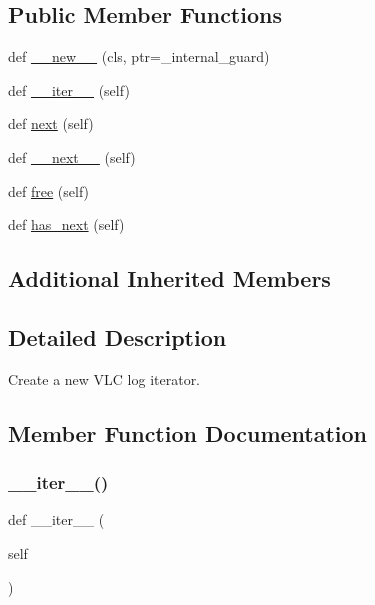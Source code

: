 \subsection*{Public Member Functions}
\begin{DoxyCompactItemize}
\item 
def \hyperlink{classvlc_1_1_log_iterator_a2ed91930af7622fec54ade5b2d4b2315}{\+\_\+\+\_\+new\+\_\+\+\_\+} (cls, ptr=\+\_\+internal\+\_\+guard)
\item 
def \hyperlink{classvlc_1_1_log_iterator_a45163c19b7c87f553c6f1d055d4668cb}{\+\_\+\+\_\+iter\+\_\+\+\_\+} (self)
\item 
def \hyperlink{classvlc_1_1_log_iterator_a9dbee9488c9365114fed347d1a8846f1}{next} (self)
\item 
def \hyperlink{classvlc_1_1_log_iterator_a71d9958aa7271de5bb07b861c559d970}{\+\_\+\+\_\+next\+\_\+\+\_\+} (self)
\item 
def \hyperlink{classvlc_1_1_log_iterator_abc0100ebe0f74d4c2e0da92529c2890b}{free} (self)
\item 
def \hyperlink{classvlc_1_1_log_iterator_aa8de9cca1082708d185d2850c9f2a29a}{has\+\_\+next} (self)
\end{DoxyCompactItemize}
\subsection*{Additional Inherited Members}


\subsection{Detailed Description}
\begin{DoxyVerb}Create a new VLC log iterator.\end{DoxyVerb}
 

\subsection{Member Function Documentation}
\mbox{\label{classvlc_1_1_log_iterator_a45163c19b7c87f553c6f1d055d4668cb}} 
\subsubsection{\texorpdfstring{\+\_\+\+\_\+iter\+\_\+\+\_\+()}{\_\_iter\_\_()}}
{\footnotesize\ttfamily def \+\_\+\+\_\+iter\+\_\+\+\_\+ (\begin{DoxyParamCaption}\item[{}]{self }\end{DoxyParamCaption})}

